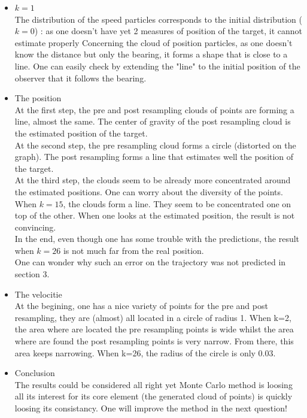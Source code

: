 \documentclass[english,DIV=13]{scrreprt}
\begin{document}
\begin{itemize}
\item $k=1$\\
The distribution of the speed particles corresponds to the initial distribution ($k=0$) : as one doesn't have yet 2 measures 
of position of the target, it cannot estimate properly 
Concerning the cloud of position particles, as one doesn't know the distance but only the bearing, it forms a shape
that is close to a line. One can easily check by extending the "line" to the initial position of the observer that it 
follows the bearing.



\item The position\\
At the first step, the pre and post resampling clouds of points are forming a line, almost
the same. The center of gravity of the post resampling cloud is the estimated position
of the target.\\
At the second step, the pre resampling cloud forms a circle (distorted on the graph). 
The post resampling forms a line that estimates well the position of the target.\\
At the third step, the clouds seem to be already more concentrated around
the estimated positions. One can worry about the diversity of the points.\\
When $k=15$, the clouds form a line. They seem to be concentrated one
on top of the other. When one looks at the estimated position, the result
is not convincing. \\
In the end, even though one has some trouble with the predictions, the result
when $k=26$ is not much far from the real position.\\
One can wonder why such an error on the trajectory was not predicted in
section 3.

\item The velocitie\\
At the begining, one has a nice variety of points for the pre and post
resampling, they are (almost) all located in a circle of radius 1.
When k=2, the area where are located the pre resampling points is wide whilst
the area where are found the post resampling points is very narrow. From there, 
this area keeps narrowing. When k=26, the radius of the circle is only 0.03.

\item Conclusion\\
The results could be considered all right yet Monte Carlo method is loosing all its interest
for its core element (the generated cloud of points) is quickly loosing its
consistancy. One will improve the method in the next question!
\end{itemize} 
\end{document}
